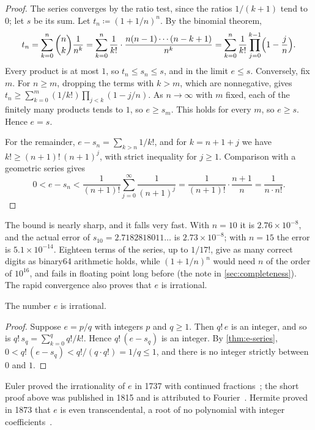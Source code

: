 \begin{proof}
The series converges by the ratio test, since the ratios $1/(k+1)$ tend to $0$; let $s$ be its sum. Let $t_n\coloneqq(1+1/n)^n$. By the binomial theorem,
\[
t_n=\sum_{k=0}^n\binom nk\frac1{n^k}=\sum_{k=0}^n\frac1{k!}\cdot\frac{n(n-1)\cdots(n-k+1)}{n^k}=\sum_{k=0}^n\frac1{k!}\prod_{j=0}^{k-1}\Bigl(1-\frac jn\Bigr).
\]
Every product is at most $1$, so $t_n\le s_n\le s$, and in the limit $e\le s$. Conversely, fix $m$. For $n\ge m$, dropping the terms with $k>m$, which are nonnegative, gives $t_n\ge\sum_{k=0}^m(1/k!)\prod_{j<k}(1-j/n)$. As $n\to\infty$ with $m$ fixed, each of the finitely many products tends to $1$, so $e\ge s_m$. This holds for every $m$, so $e\ge s$. Hence $e=s$.

For the remainder, $e-s_n=\sum_{k>n}1/k!$, and for $k=n+1+j$ we have $k!\ge(n+1)!\,(n+1)^j$, with strict inequality for $j\ge1$. Comparison with a geometric series gives
\[
0<e-s_n<\frac1{(n+1)!}\sum_{j=0}^\infty\frac1{(n+1)^j}=\frac1{(n+1)!}\cdot\frac{n+1}n=\frac1{n\cdot n!} .
\]
\end{proof}

The bound is nearly sharp, and it falls very fast. With $n=10$ it is $2.76\times10^{-8}$, and the actual error of $s_{10}=2.7182818011\ldots$ is $2.73\times10^{-8}$; with $n=15$ the error is $5.1\times10^{-14}$. Eighteen terms of the series, up to $1/17!$, give as many correct digits as binary64 arithmetic holds, while $(1+1/n)^n$ would need $n$ of the order of $10^{16}$, and fails in floating point long before (the note in \cref{sec:completeness}). The rapid convergence also proves that $e$ is irrational.

\begin{theorem}
\label{thm:e-irrational}
The number $e$ is irrational.
\end{theorem}

\begin{proof}
Suppose $e=p/q$ with integers $p$ and $q\ge1$. Then $q!\,e$ is an integer, and so is $q!\,s_q=\sum_{k=0}^qq!/k!$. Hence $q!\,(e-s_q)$ is an integer. By \cref{thm:e-series}, $0<q!\,(e-s_q)<q!/(q\cdot q!)=1/q\le1$, and there is no integer strictly between $0$ and $1$.
\end{proof}

Euler proved the irrationality of $e$ in 1737 with continued fractions~\cite{lagarias2013gamma}; the short proof above was published in 1815 and is attributed to Fourier~\cite{aigner2018proofs}. Hermite proved in 1873 that $e$ is even transcendental, a root of no polynomial with integer coefficients~\cite{hardywright2008}.

